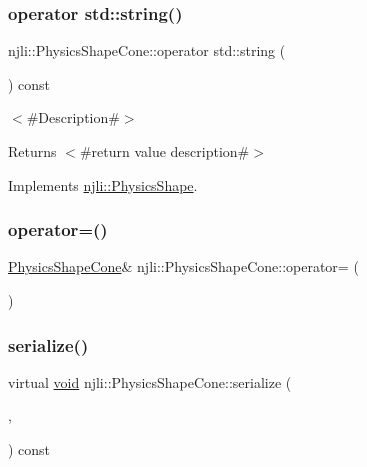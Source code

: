 \subsubsection{\texorpdfstring{operator std\+::string()}{operator std::string()}}
{\footnotesize\ttfamily njli\+::\+Physics\+Shape\+Cone\+::operator std\+::string (\begin{DoxyParamCaption}{ }\end{DoxyParamCaption}) const\hspace{0.3cm}{\ttfamily [virtual]}}

$<$\#\+Description\#$>$

\begin{DoxyReturn}{Returns}
$<$\#return value description\#$>$ 
\end{DoxyReturn}


Implements \mbox{\hyperlink{classnjli_1_1_physics_shape_a890d915f88af06dcf1ac1fa4f5943dc2}{njli\+::\+Physics\+Shape}}.

\mbox{\label{classnjli_1_1_physics_shape_cone_ad649d8d18a88ccedd68e4dda3b3b8c0f}} 
\subsubsection{\texorpdfstring{operator=()}{operator=()}}
{\footnotesize\ttfamily \mbox{\hyperlink{classnjli_1_1_physics_shape_cone}{Physics\+Shape\+Cone}}\& njli\+::\+Physics\+Shape\+Cone\+::operator= (\begin{DoxyParamCaption}\item[{const \mbox{\hyperlink{classnjli_1_1_physics_shape_cone}{Physics\+Shape\+Cone}} \&}]{ }\end{DoxyParamCaption})\hspace{0.3cm}{\ttfamily [protected]}}

\mbox{\label{classnjli_1_1_physics_shape_cone_a8697c559d914b92d57671d4204e336da}} 
\subsubsection{\texorpdfstring{serialize()}{serialize()}}
{\footnotesize\ttfamily virtual \mbox{\hyperlink{_thread_8h_af1e856da2e658414cb2456cb6f7ebc66}{void}} njli\+::\+Physics\+Shape\+Cone\+::serialize (\begin{DoxyParamCaption}\item[{\mbox{\hyperlink{_thread_8h_af1e856da2e658414cb2456cb6f7ebc66}{void}} $\ast$}]{,  }\item[{bt\+Serializer $\ast$}]{ }\end{DoxyParamCaption}) const\hspace{0.3cm}{\ttfamily [virtual]}}

